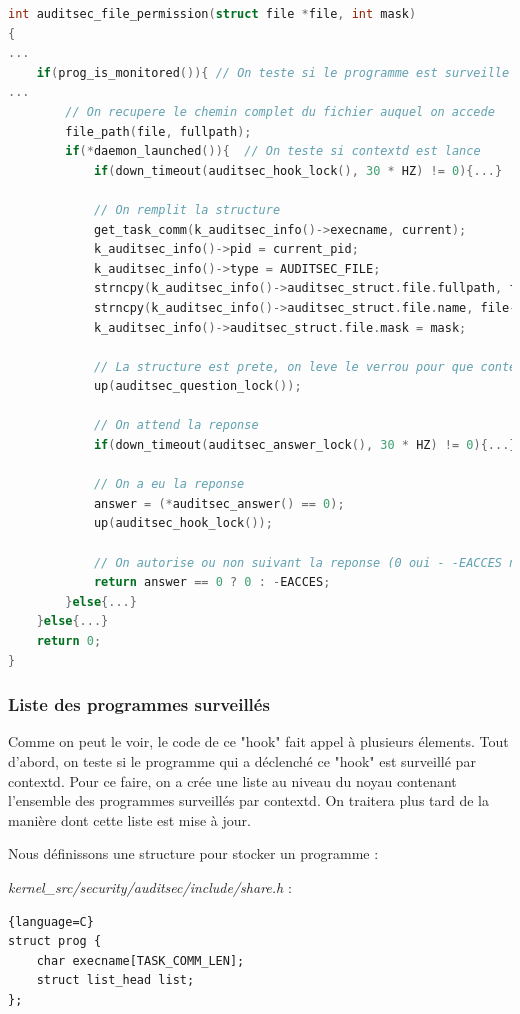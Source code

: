 \documentclass[pdftex,a4paper,titlepage,11pt]{article}
\begin{document}
\begin{lstlisting}[language=C]
int auditsec_file_permission(struct file *file, int mask)
{
...
	if(prog_is_monitored()){ // On teste si le programme est surveille
...
		// On recupere le chemin complet du fichier auquel on accede
		file_path(file, fullpath);
		if(*daemon_launched()){  // On teste si contextd est lance
			if(down_timeout(auditsec_hook_lock(), 30 * HZ) != 0){...}
			
			// On remplit la structure
			get_task_comm(k_auditsec_info()->execname, current);
			k_auditsec_info()->pid = current_pid;
			k_auditsec_info()->type = AUDITSEC_FILE;
			strncpy(k_auditsec_info()->auditsec_struct.file.fullpath, fullpath, PATH_MAX + 1);
			strncpy(k_auditsec_info()->auditsec_struct.file.name, file->f_path.dentry->d_name.name, NAME_MAX + 1);
			k_auditsec_info()->auditsec_struct.file.mask = mask;
			
			// La structure est prete, on leve le verrou pour que contextd puisse la recuperer
			up(auditsec_question_lock());
			
			// On attend la reponse
			if(down_timeout(auditsec_answer_lock(), 30 * HZ) != 0){...}
			
			// On a eu la reponse			
			answer = (*auditsec_answer() == 0);
			up(auditsec_hook_lock());

			// On autorise ou non suivant la reponse (0 oui - -EACCES non)
			return answer == 0 ? 0 : -EACCES;
		}else{...}
	}else{...}
	return 0;
}
\end{lstlisting}

\subsubsection{Liste des programmes surveillés}

Comme on peut le voir, le code de ce "hook" fait appel à plusieurs élements. Tout d'abord, on teste si le programme qui a déclenché ce "hook" est surveillé par contextd. Pour ce faire, on a crée une liste au niveau du noyau contenant l'ensemble des programmes surveillés par contextd. On traitera plus tard de la manière dont cette liste est mise à jour.

Nous définissons une structure pour stocker un programme :

\textit{{kernel\_src}/security/auditsec/include/share.h} :
\begin{lstlisting}{language=C}
struct prog {
	char execname[TASK_COMM_LEN];
	struct list_head list;
};
\end{lstlisting}
\end{document}
